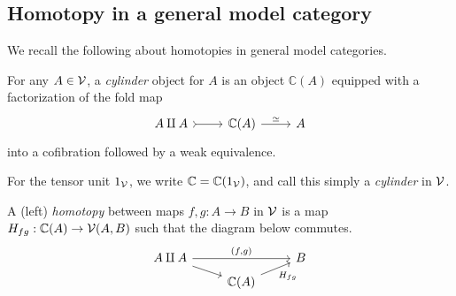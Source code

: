 \documentclass[a4paper,10pt
,draft
]{article}%
\renewcommand{\1}{\ensuremath{\mathbb{id}}}
\begin{document}
 






\subsection{Homotopy in a general model category}


We recall the following about homotopies in general model categories.
\begin{definition}
      For any $A \in \mathcal V$, a \textit{cylinder} object for $A$ is an object $\mathbb C(A)$ equipped with a factorization of the fold map
      \begin{equation}
            \begin{tikzcd}
                  A \amalg A \arrow[r, tail]
                  &
                  \mathbb C(A) \arrow[r, "\simeq"]
                  &
                  A
            \end{tikzcd}
      \end{equation}
      into a cofibration followed by a weak equivalence.
      
      For the tensor unit $1_{\mathcal V}$, we write $\mathbb C = \mathbb C(1_{\mathcal V})$, and call this simply a \textit{cylinder} in $\mathcal V$.
      
      A (left) \textit{homotopy} between maps $f,g: A \to B$ in $\mathcal V$ is a map $H_{fg}: \mathbb C(A) \to \mathcal V(A,B)$ such that
      the diagram below commutes.
      \begin{equation}
            \begin{tikzcd}[row sep = tiny]
                  A \amalg A \arrow[rr, "{(f,g)}"] \arrow[dr]
                  &&
                  B
                  \\
                  &
                  \mathbb C(A) \arrow[ur, "H_{fg}"']
            \end{tikzcd}
      \end{equation}
\end{definition}

\end{document}
